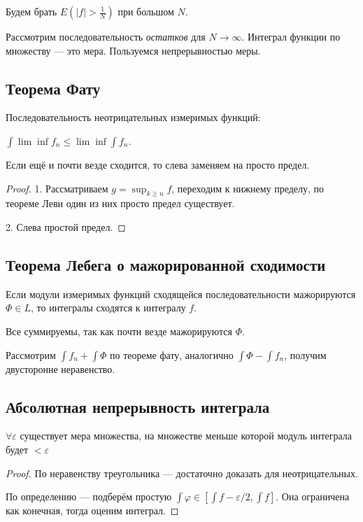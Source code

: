 \documentclass[12pt, a4paper, oneside]{memoir}
\begin{document}
Будем брать $E(|f| > \frac{1}{N})$ при большом $N$.

Рассмотрим последовательность \textit{остатков} для $N → \infty$.
Интеграл функции по множеству — это мера. Пользуемся непрерывностью меры.

\subsection{Теорема Фату}

Последовательность неотрицательных измеримых функций:

$\int \lim \inf f_n \leqslant \lim \inf \int f_n$.

Если ещё и почти везде сходится, то слева заменяем на просто предел.

\begin{proof}
    1. Рассматриваем $g = \sup_{k \geqslant n} f$, переходим к нижнему пределу, по теореме Леви один из них просто предел существует.

    2. Слева простой предел.
\end{proof}


\subsection{Теорема Лебега о мажорированной сходимости}

Если модули измеримых функций сходящейся последовательности мажорируются $\Phi \in L$, то интегралы сходятся к интегралу $f$.

Все суммируемы, так как почти везде мажорируются $\Phi$.

Рассмотрим $\int f_n + \int \Phi$ по теореме фату, аналогично $\int \Phi - \int f_n$, получим двусторонне неравенство.


\subsection{Абсолютная непрерывность интеграла}

$\forall \varepsilon$ существует мера множества, на множестве меньше которой модуль интеграла будет $< \varepsilon$

\begin{proof}
    По неравенству треугольника — достаточно доказать для неотрицательных.

    По определению — подберём простую $\int \varphi \in [\int f - \varepsilon/2, \int f]$. Она ограничена как конечная, тогда оценим интеграл.
\end{proof}
\end{document}
